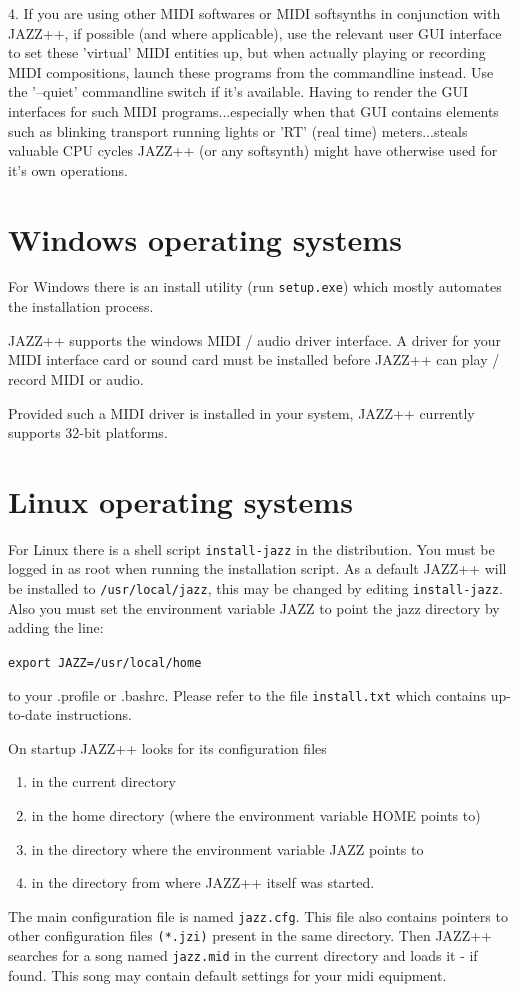 \documentclass[letterpaper]{report}
\begin{document}
4. If you are using other MIDI softwares or MIDI softsynths in conjunction with
JAZZ++, if possible (and where applicable), use the relevant user GUI interface
to set these 'virtual' MIDI entities up, but when actually playing or recording
MIDI compositions, launch these programs from the commandline instead. Use the
'--quiet' commandline switch if it's available. Having to render the GUI
interfaces for such MIDI programs...especially when that GUI contains elements
such as blinking transport running lights or 'RT' (real time) meters...steals
valuable CPU cycles JAZZ++ (or any softsynth) might have otherwise used for it's
own operations.


 
\section{Windows operating systems}

For Windows there is an install utility (run {\tt setup.exe}) which
mostly automates the installation process.

JAZZ++ supports the windows MIDI / audio driver interface. A driver for your
MIDI interface card or sound card must be installed before JAZZ++ can play /
record MIDI or audio.

Provided such a MIDI driver is installed in your system, JAZZ++ currently
supports 32-bit platforms.

\section{Linux operating systems}

For Linux there is a shell script {\tt install-jazz} in the
distribution. You must be logged in as root when running the installation
script. As a default JAZZ++ will be installed to {\tt /usr/local/jazz},
this may be changed by editing {\tt install-jazz}. Also you
must set the environment variable JAZZ to point the jazz directory by
adding the line:

{\tt export JAZZ=/usr/local/home}

to your .profile or .bashrc. Please refer to the file
{\tt install.txt} which contains up-to-date instructions.

On startup JAZZ++ looks for its configuration files
\begin{enumerate}
\item in the current directory
\item in the home directory (where the environment variable HOME points to)
\item in the directory where the environment variable JAZZ points to
\item in the directory from where JAZZ++ itself was started.
\end{enumerate}
The main configuration file is named {\tt jazz.cfg}.
This file also contains pointers to other configuration files {\tt (*.jzi)}
present in the same directory.
Then JAZZ++ searches for a song named {\tt jazz.mid} in the current directory
and loads it - if found. This song may contain default settings for your
midi equipment.
\end{document}
